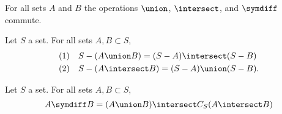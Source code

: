 \begin{prop}
  For all sets $A$ and $B$ the operations $\union$, $\intersect$, and $\symdiff$ commute.
\end{prop}

\begin{prop}
  Let $S$ a set.
  For all sets $A, B \subset S$,
  \[
    \begin{aligned}
      \text{(1)} \quad & S - (A \union B) = (S - A) \intersect (S - B) \\
      \text{(2)} \quad & S - (A \intersect B) = (S - A) \union (S - B).
    \end{aligned}
  \]
\end{prop}

\begin{prop}
  Let $S$ a set. For all sets $A, B \subset S$,
  \[
    A \symdiff B = (A \union B) \intersect C_S(A \intersect B)
  \]
\end{prop}
